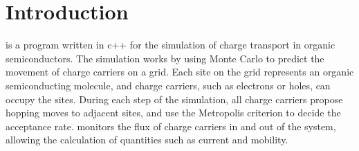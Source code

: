 \newpage
\section{Introduction}
\label{sec:introduction}
\Langmuir is a program written in c++ for the simulation of charge transport
    in organic semiconductors.
The simulation works by using Monte Carlo to predict the movement of charge
    carriers on a grid.
Each site on the grid represents an organic semiconducting molecule, and
    charge carriers, such as electrons or holes, can occupy the sites.
During each step of the simulation, all charge carriers propose hopping moves
    to adjacent sites, and use the Metropolis criterion to decide the acceptance
    rate.
\Langmuir monitors the flux of charge carriers in and out of the system,
    allowing the calculation of quantities such as current and mobility.

